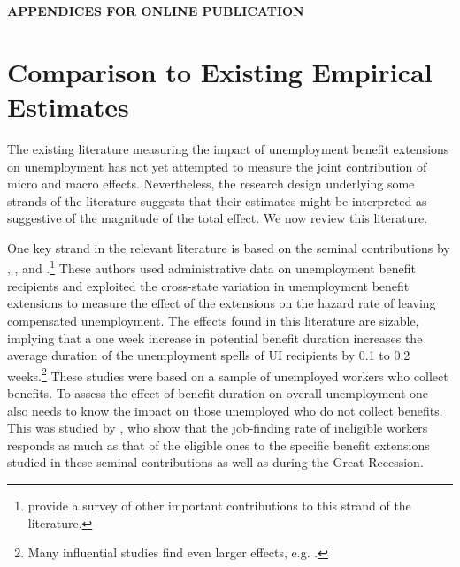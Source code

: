 \documentclass[12pt]{article}
\newcommand{\1}{\mathbf{1}}
\begin{document}
\begin{appendix}

\onehalfspacing
\setcounter{page}{1}

\renewcommand{\thetable}{A-\arabic{table}}
\setcounter{table}{0}

\renewcommand{\thefigure}{A-\arabic{figure}}
\setcounter{figure}{0}

\renewcommand{\theequation}{A\arabic{equation}}
\setcounter{equation}{0}

\renewcommand{\thesection}{\Roman{section}}
\setcounter{section}{0}


\begin{center}
{\bf APPENDICES FOR ONLINE PUBLICATION}
\end{center}



\section{Comparison to Existing Empirical Estimates}
\label{sec:literature}
The existing literature measuring the impact of unemployment benefit extensions on unemployment has not yet attempted to measure the joint contribution of micro and macro effects. Nevertheless, the research design underlying some strands of the literature suggests that their estimates might be interpreted as suggestive of the magnitude of the total effect. We now review this literature.





One key strand in the relevant literature is based on the seminal contributions by \citet{moffitt:85}, \citet{katz+meyer:90}, and \citet{meyer:90}.\footnote{\citet{krueger+meyer:02} provide a survey of other important contributions to this strand of the literature.} These authors used administrative data on unemployment benefit recipients and exploited the cross-state variation in unemployment benefit extensions to measure the effect of the extensions on the hazard rate of leaving compensated unemployment. The effects found in this literature are sizable, implying that a one week increase in potential benefit duration increases the average duration of the unemployment spells of UI recipients by 0.1 to 0.2 weeks.\footnote{Many influential studies find even larger effects, e.g. \citet{ham+rea:87}.} These studies were based on a sample of unemployed workers who collect benefits. To assess the effect of benefit duration on overall unemployment one also needs to know the impact on those unemployed who do not collect benefits. This was studied by \citet{hagedorn+manovskii+mitman:15_micro}, who show that the job-finding rate of ineligible workers responds as much as that of the eligible ones to the specific benefit extensions studied in these seminal contributions as well as during the Great Recession.






\end{appendix}
\end{document}
